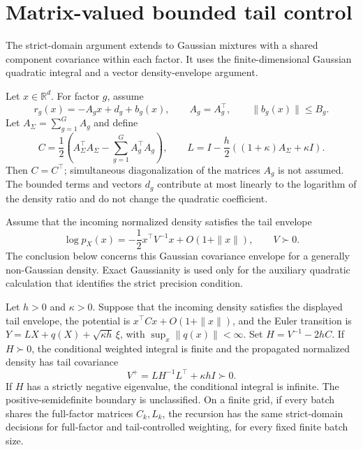 \section{Matrix-valued bounded tail control}
\label{sec:matrix-tail-extension}

The strict-domain argument extends to Gaussian mixtures with a shared component covariance within each factor. It uses the finite-dimensional Gaussian quadratic integral and a vector density-envelope argument.

Let $x\in\mathbb R^d$. For factor $g$, assume
\[
r_g(x)=-A_gx+d_g+b_g(x),\qquad A_g=A_g^\top,\qquad \|b_g(x)\|\leq B_g.
\]
Let $A_\Sigma=\sum_{g=1}^GA_g$ and define
\[
C=\frac12\left(A_\Sigma^\top A_\Sigma-\sum_{g=1}^GA_g^\top A_g\right),\qquad
L=I-\frac h2\left((1+\kappa)A_\Sigma+\kappa I\right).
\]
Then $C=C^\top$; simultaneous diagonalization of the matrices $A_g$ is not assumed. The bounded terms and vectors $d_g$ contribute at most linearly to the logarithm of the density ratio and do not change the quadratic coefficient.

Assume that the incoming normalized density satisfies the tail envelope
\[
\log p_X(x)=-\frac12x^\top V^{-1}x+O(1+\|x\|),\qquad V\succ0.
\]
The conclusion below concerns this Gaussian covariance envelope for a generally non-Gaussian density. Exact Gaussianity is used only for the auxiliary quadratic calculation that identifies the strict precision condition.

\begin{theorem}
\label{thm:matrix-tail}
Let $h>0$ and $\kappa>0$. Suppose that the incoming density satisfies the displayed tail envelope, the potential is $x^\top Cx+O(1+\|x\|)$, and the Euler transition is $Y=LX+q(X)+\sqrt{\kappa h}\,\xi$, with $\sup_x\|q(x)\|<\infty$. Set $H=V^{-1}-2hC$. If $H\succ0$, the conditional weighted integral is finite and the propagated normalized density has tail covariance
\[
V^+=LH^{-1}L^\top+\kappa hI\succ0.
\]
If $H$ has a strictly negative eigenvalue, the conditional integral is infinite. The positive-semidefinite boundary is unclassified. On a finite grid, if every batch shares the full-factor matrices $C_k,L_k$, the recursion has the same strict-domain decisions for full-factor and tail-controlled weighting, for every fixed finite batch size.
\end{theorem}

